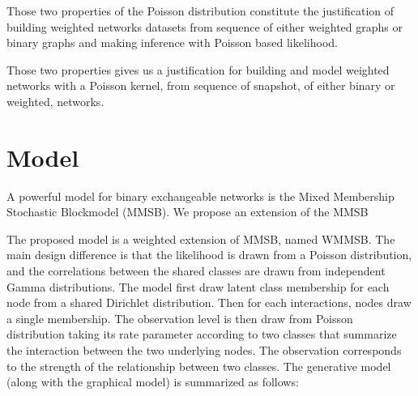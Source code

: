 Those two properties of the Poisson distribution constitute the justification of building weighted networks datasets from sequence of either weighted graphs or binary graphs and making inference with Poisson    based likelihood.                                                                                                                                                                                                  
                                                                                                                                                                                                                   
Those two properties gives us a justification for building and model weighted networks with a Poisson kernel, from sequence of snapshot, of either binary or weighted, networks.  

\section{Model}


A powerful model for binary exchangeable networks is the Mixed Membership Stochastic Blockmodel (MMSB). We propose an extension of the MMSB

The proposed model is a weighted extension of MMSB, named WMMSB. The main design difference is that the likelihood is drawn from a Poisson distribution, and the correlations between the shared classes are drawn from independent Gamma distributions. The model first draw latent class membership for each node from a shared Dirichlet distribution. Then for each interactions,  nodes draw a single membership. The observation level is then draw from Poisson distribution taking its rate parameter according to two classes that summarize the interaction between the two underlying nodes. The observation corresponds to the strength of the relationship between two classes. The generative model (along  with the graphical model) is summarized as follows:

